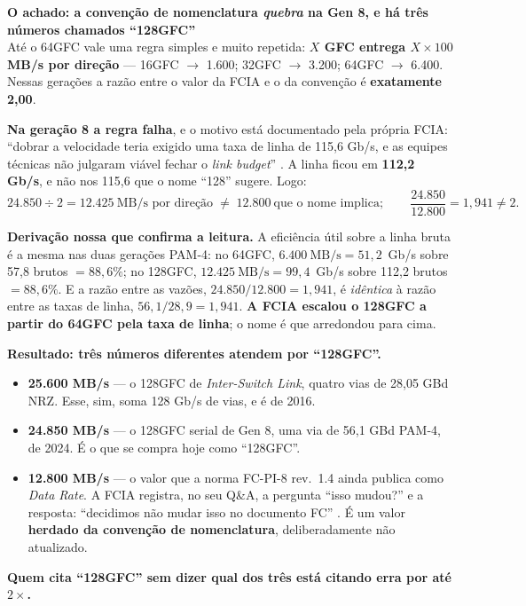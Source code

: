 \documentclass[11pt,a4paper]{article}
\newcommand{\correcao}[2]{%
  \begin{center}\begin{minipage}{0.96\textwidth}
  \colorbox{fundo}{\begin{minipage}{\dimexpr\linewidth-2\fboxsep}
  \vspace{2pt}\textbf{\color{laranja}\small #1}\\[1pt]\footnotesize #2\vspace{3pt}
  \end{minipage}}\end{minipage}\end{center}}
\begin{document}
\correcao{O achado: a convenção de nomenclatura \emph{quebra} na Gen 8, e há \textbf{três} números
chamados ``128GFC''}{%
Até o 64GFC vale uma regra simples e muito repetida: \textbf{$X$ GFC entrega $X \times 100$ MB/s por
direção} --- 16GFC $\rightarrow$ 1.600; 32GFC $\rightarrow$ 3.200; 64GFC $\rightarrow$ 6.400. Nessas
gerações a razão entre o valor da FCIA e o da convenção é \textbf{exatamente 2,00}.

\smallskip
\textbf{Na geração 8 a regra falha}, e o motivo está documentado pela própria FCIA: ``dobrar a
velocidade teria exigido uma taxa de linha de 115,6 Gb/s, e as equipes técnicas não julgaram
viável fechar o \textit{link budget}'' \cite{fcia128}. A linha ficou em \textbf{112,2 Gb/s}, e não
nos 115,6 que o nome ``128'' sugere. Logo:
\[
24.850 \div 2 = \mathbf{12.425}\ \text{MB/s por direção} \;\neq\; 12.800\ \text{que o nome implica};
\qquad \frac{24.850}{12.800} = 1{,}941 \neq 2.
\]

\smallskip
\textbf{Derivação nossa que confirma a leitura.} A eficiência útil sobre a linha bruta é a mesma nas
duas gerações PAM-4: no 64GFC, $6.400\ \text{MB/s} = 51{,}2$~Gb/s sobre 57,8 brutos $= 88{,}6\%$; no
128GFC, $12.425\ \text{MB/s} = 99{,}4$~Gb/s sobre 112,2 brutos $= 88{,}6\%$. E a razão entre as
vazões, $24.850/12.800 = 1{,}941$, é \emph{idêntica} à razão entre as taxas de linha,
$56{,}1/28{,}9 = 1{,}941$. \textbf{A FCIA escalou o 128GFC a partir do 64GFC pela taxa de linha}; o
nome é que arredondou para cima.

\smallskip
\textbf{Resultado: três números diferentes atendem por ``128GFC''.}
\begin{itemize}[leftmargin=0.7cm,itemsep=1pt,topsep=2pt]
\item \textbf{25.600 MB/s} --- o 128GFC de \textit{Inter-Switch Link}, quatro vias de 28,05 GBd NRZ.
      Esse, sim, soma 128 Gb/s de vias, e é de 2016.
\item \textbf{24.850 MB/s} --- o 128GFC serial de Gen 8, uma via de 56,1 GBd PAM-4, de 2024. É o que
      se compra hoje como ``128GFC''.
\item \textbf{12.800 MB/s} --- o valor que a norma FC-PI-8 rev.\ 1.4 ainda publica como
      \textit{Data Rate}. A FCIA registra, no seu Q\&A, a pergunta ``isso mudou?'' e a resposta:
      ``decidimos não mudar isso no documento FC'' \cite{fcia128}. É um valor \textbf{herdado da
      convenção de nomenclatura}, deliberadamente não atualizado.
\end{itemize}

\textbf{Quem cita ``128GFC'' sem dizer qual dos três está citando erra por até $2\times$.}}
\end{document}
